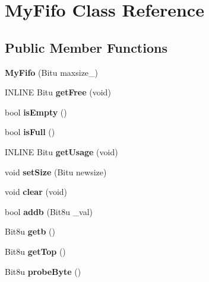 \hypertarget{classMyFifo}{\section{My\-Fifo Class Reference}
\label{classMyFifo}
}
\subsection*{Public Member Functions}
\begin{DoxyCompactItemize}
\item 
\hypertarget{classMyFifo_a56c9852726dcb15bda8af192ab484026}{{\bfseries My\-Fifo} (Bitu maxsize\-\_\-)}\label{classMyFifo_a56c9852726dcb15bda8af192ab484026}

\item 
\hypertarget{classMyFifo_a13b2b958cd843ed56ac522498e61139e}{I\-N\-L\-I\-N\-E Bitu {\bfseries get\-Free} (void)}\label{classMyFifo_a13b2b958cd843ed56ac522498e61139e}

\item 
\hypertarget{classMyFifo_a3d2b2f067edcb23fa441775453d51307}{bool {\bfseries is\-Empty} ()}\label{classMyFifo_a3d2b2f067edcb23fa441775453d51307}

\item 
\hypertarget{classMyFifo_a41715a9de8da3fc5e6f7c77b03fc4871}{bool {\bfseries is\-Full} ()}\label{classMyFifo_a41715a9de8da3fc5e6f7c77b03fc4871}

\item 
\hypertarget{classMyFifo_a519f67c49e64dbf4550e42e64effea9f}{I\-N\-L\-I\-N\-E Bitu {\bfseries get\-Usage} (void)}\label{classMyFifo_a519f67c49e64dbf4550e42e64effea9f}

\item 
\hypertarget{classMyFifo_a8e0bf6c7f6ef3ae8ac3620ce7f1cdea7}{void {\bfseries set\-Size} (Bitu newsize)}\label{classMyFifo_a8e0bf6c7f6ef3ae8ac3620ce7f1cdea7}

\item 
\hypertarget{classMyFifo_a4c8289260ab42d82249e93fa24a604e3}{void {\bfseries clear} (void)}\label{classMyFifo_a4c8289260ab42d82249e93fa24a604e3}

\item 
\hypertarget{classMyFifo_a245f70563e188cc4e7bc6a239322d636}{bool {\bfseries addb} (Bit8u \-\_\-val)}\label{classMyFifo_a245f70563e188cc4e7bc6a239322d636}

\item 
\hypertarget{classMyFifo_a1622e9cdf807d0d9e2e1fa3e16489bd7}{Bit8u {\bfseries getb} ()}\label{classMyFifo_a1622e9cdf807d0d9e2e1fa3e16489bd7}

\item 
\hypertarget{classMyFifo_ac36472c79f9ecd70a5665bbf48b536ca}{Bit8u {\bfseries get\-Top} ()}\label{classMyFifo_ac36472c79f9ecd70a5665bbf48b536ca}

\item 
\hypertarget{classMyFifo_a71b1df5930bc8bfeb325b2d388b130a4}{Bit8u {\bfseries probe\-Byte} ()}\label{classMyFifo_a71b1df5930bc8bfeb325b2d388b130a4}

\end{DoxyCompactItemize}


